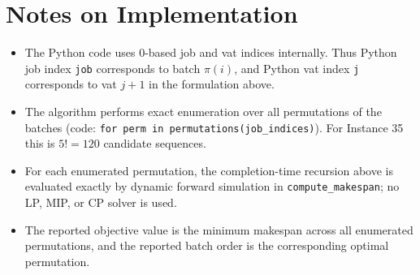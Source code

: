 \section*{Notes on Implementation}

\begin{itemize}
    \item The Python code uses 0-based job and vat indices internally. Thus Python job index \texttt{job} corresponds to batch $\pi(i)$, and Python vat index \texttt{j} corresponds to vat $j+1$ in the formulation above.
    \item The algorithm performs exact enumeration over all permutations of the batches (code: \texttt{for perm in permutations(job\_indices)}). For Instance 35 this is $5! = 120$ candidate sequences.
    \item For each enumerated permutation, the completion-time recursion above is evaluated exactly by dynamic forward simulation in \texttt{compute\_makespan}; no LP, MIP, or CP solver is used.
    \item The reported objective value is the minimum makespan across all enumerated permutations, and the reported batch order is the corresponding optimal permutation.
\end{itemize}
